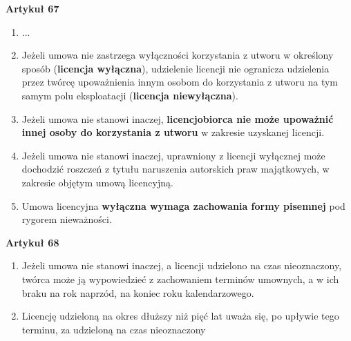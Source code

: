 \documentclass[12pt,a4paper]{article}
\begin{document}
\textbf{Artykuł 67}
\begin{enumerate}
\item ...
\item Jeżeli umowa nie zastrzega wyłączności korzystania z utworu w określony sposób (\textbf{licencja wyłączna}), udzielenie licencji nie ogranicza udzielenia przez twórcę upoważnienia innym osobom do korzystania z utworu na tym samym polu eksploatacji (\textbf{licencja niewyłączna}).
\item Jeżeli umowa nie stanowi inaczej, \textbf{licencjobiorca nie może upoważnić innej osoby do korzystania z utworu} w zakresie uzyskanej licencji.
\item Jeżeli umowa nie stanowi inaczej, uprawniony z licencji wyłącznej może dochodzić roszczeń z tytułu naruszenia autorskich praw majątkowych, w zakresie objętym umową licencyjną.
\item Umowa licencyjna \textbf{wyłączna wymaga zachowania formy pisemnej} pod rygorem nieważności.
\end{enumerate}
\textbf{Artykuł 68}
\begin{enumerate}
\item Jeżeli umowa nie stanowi inaczej, a licencji udzielono na czas nieoznaczony, twórca może ją wypowiedzieć z zachowaniem terminów umownych, a w ich braku na rok naprzód, na koniec roku kalendarzowego.
\item Licencję udzieloną na okres dłuższy niż pięć lat uważa się, po upływie tego terminu, za udzieloną na czas nieoznaczony
\end{enumerate}
\end{document}
